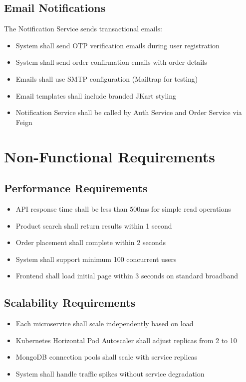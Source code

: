 \subsection{Email Notifications}

The Notification Service sends transactional emails:

\begin{itemize}
    \item System shall send OTP verification emails during user registration
    \item System shall send order confirmation emails with order details
    \item Emails shall use SMTP configuration (Mailtrap for testing)
    \item Email templates shall include branded JKart styling
    \item Notification Service shall be called by Auth Service and Order Service via Feign
\end{itemize}

\section{Non-Functional Requirements}

\subsection{Performance Requirements}

\begin{itemize}
    \item API response time shall be less than 500ms for simple read operations
    \item Product search shall return results within 1 second
    \item Order placement shall complete within 2 seconds
    \item System shall support minimum 100 concurrent users
    \item Frontend shall load initial page within 3 seconds on standard broadband
\end{itemize}

\subsection{Scalability Requirements}

\begin{itemize}
    \item Each microservice shall scale independently based on load
    \item Kubernetes Horizontal Pod Autoscaler shall adjust replicas from 2 to 10
    \item MongoDB connection pools shall scale with service replicas
    \item System shall handle traffic spikes without service degradation
\end{itemize}

